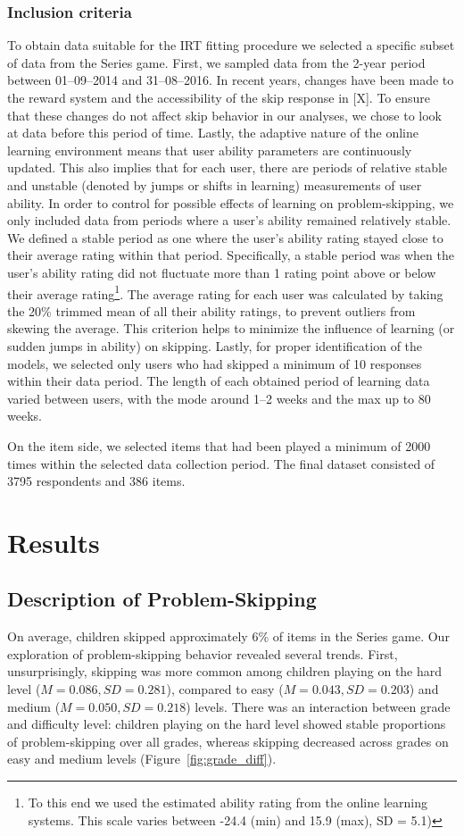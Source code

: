 \documentclass[11pt]{article}
\begin{document}
\subsubsection{Inclusion criteria}
To obtain data suitable for the IRT fitting procedure we selected a specific subset of data from the Series game. First, we sampled data from the 2-year period between 01--09--2014 and 31--08--2016. In recent years, changes have been made to the reward system and the accessibility of the skip response in [X]. To ensure that these changes do not affect skip behavior in our analyses, we chose to look at data before this period of time. Lastly, the adaptive nature of the online learning environment means that user ability parameters are continuously updated. This also implies that for each user, there are periods of relative stable and unstable (denoted by jumps or shifts in learning) measurements of user ability. In order to control for possible effects of learning on problem-skipping, we only included data from periods where a user's ability remained relatively stable. We defined a stable period as one where the user's ability rating stayed close to their average rating within that period. Specifically, a stable period was when the user's ability rating did not fluctuate more than 1 rating point above or below their average rating\footnote{To this end we used the estimated ability rating from the online learning systems. This scale varies between -24.4 (min) and 15.9 (max), SD = 5.1)}. The average rating for each user was calculated by taking the 20\% trimmed mean of all their ability ratings, to prevent outliers from skewing the average. This criterion helps to minimize the influence of learning (or sudden jumps in ability) on skipping. Lastly, for proper identification of the models, we selected only users who had skipped a minimum of 10 responses within their data period. The length of each obtained period of learning data varied between users, with the mode around 1--2 weeks and the max up to 80 weeks.

On the item side, we selected items that had been played a minimum of \num{2000} times within the selected data collection period. The final dataset consisted of \num{3795} respondents and \num{386} items. 

\section{Results}
\subsection{Description of Problem-Skipping }
On average, children skipped approximately 6\% of items in the Series game. Our exploration of problem-skipping behavior revealed several trends. First, unsurprisingly, skipping was more common among children playing on the hard level ($M = 0.086, SD = 0.281$), compared to easy ($M = 0.043, SD = 0.203$) and medium ($M = 0.050, SD = 0.218$) levels. There was an interaction between grade and difficulty level: children playing on the hard level showed stable proportions of problem-skipping over all grades, whereas skipping decreased across grades on easy and medium levels (Figure~\ref{fig:grade_diff}). 
\end{document}
